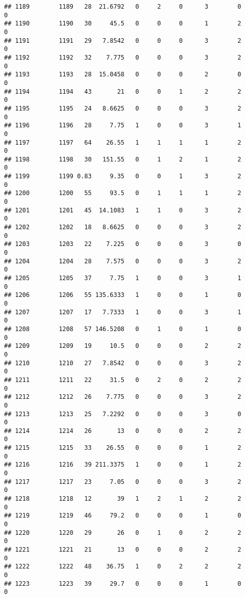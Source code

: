 \documentclass[
]{article}
\begin{document}
\begin{verbatim}
## 1189        1189   28  21.6792   0     2     0      3        0         0
## 1190        1190   30     45.5   0     0     0      1        2         0
## 1191        1191   29   7.8542   0     0     0      3        2         0
## 1192        1192   32    7.775   0     0     0      3        2         0
## 1193        1193   28  15.0458   0     0     0      2        0         0
## 1194        1194   43       21   0     0     1      2        2         0
## 1195        1195   24   8.6625   0     0     0      3        2         0
## 1196        1196   28     7.75   1     0     0      3        1         0
## 1197        1197   64    26.55   1     1     1      1        2         0
## 1198        1198   30   151.55   0     1     2      1        2         0
## 1199        1199 0.83     9.35   0     0     1      3        2         0
## 1200        1200   55     93.5   0     1     1      1        2         0
## 1201        1201   45  14.1083   1     1     0      3        2         0
## 1202        1202   18   8.6625   0     0     0      3        2         0
## 1203        1203   22    7.225   0     0     0      3        0         0
## 1204        1204   28    7.575   0     0     0      3        2         0
## 1205        1205   37     7.75   1     0     0      3        1         0
## 1206        1206   55 135.6333   1     0     0      1        0         0
## 1207        1207   17   7.7333   1     0     0      3        1         0
## 1208        1208   57 146.5208   0     1     0      1        0         0
## 1209        1209   19     10.5   0     0     0      2        2         0
## 1210        1210   27   7.8542   0     0     0      3        2         0
## 1211        1211   22     31.5   0     2     0      2        2         0
## 1212        1212   26    7.775   0     0     0      3        2         0
## 1213        1213   25   7.2292   0     0     0      3        0         0
## 1214        1214   26       13   0     0     0      2        2         0
## 1215        1215   33    26.55   0     0     0      1        2         0
## 1216        1216   39 211.3375   1     0     0      1        2         0
## 1217        1217   23     7.05   0     0     0      3        2         0
## 1218        1218   12       39   1     2     1      2        2         0
## 1219        1219   46     79.2   0     0     0      1        0         0
## 1220        1220   29       26   0     1     0      2        2         0
## 1221        1221   21       13   0     0     0      2        2         0
## 1222        1222   48    36.75   1     0     2      2        2         0
## 1223        1223   39     29.7   0     0     0      1        0         0

\end{verbatim}
\end{document}
